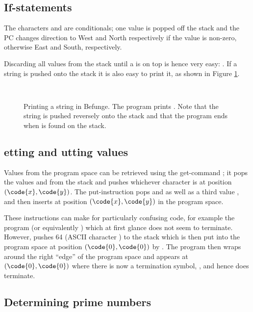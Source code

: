 \documentclass[12pt, a4paper]{article}
\begin{document}
\subsection{If-statements}
\label{sec:ifs}

The characters \code{\_} and \code{|} are conditionals; one value is popped off the stack and the PC changes direction to West and North respectively if the value is non-zero, otherwise East and South, respectively.

Discarding all values from the stack until a  is on top is hence very easy: . If a string is pushed onto the stack it is also easy to print it, as shown in Figure \ref{fig:print}.

\begin{figure}[!ht]
\centering
{}\\
\code{\hspace{3.5em}\^{} ,<}
\caption{Printing a string in Befunge. The program prints . Note that the string is pushed reversely onto the stack and that the program ends when  is found on the stack.}
\label{fig:print}
\end{figure}

\subsection{etting and utting values}
\label{sec:pandg}

Values from the program space can be retrieved using the get-command ; it pops the values  and  from the stack and pushes whichever character is at position $(\code{x}, \code{y})$. The put-instruction  pops  and  as well as a third value , and then inserts  at position $(\code{x}, \code{y})$ in the program space.

These instructions can make for particularly confusing code, for example the program  (or equivalently ) which at first glance does not seem to terminate. However,  pushes 64 (ASCII character ) to the stack which is then put into the program space at position $(\code{0}, \code{0})$ by . The program then wraps around the right “edge” of the program space and appears at $(\code{0}, \code{0})$ where there is now a termination symbol, , and hence does terminate.

\subsection{Determining prime numbers}
\end{document}
